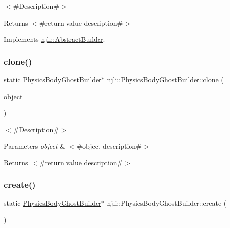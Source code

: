 $<$\#\+Description\#$>$

\begin{DoxyReturn}{Returns}
$<$\#return value description\#$>$ 
\end{DoxyReturn}


Implements \mbox{\hyperlink{classnjli_1_1_abstract_builder_aa1d220053e182c37b31b427499c6eacf}{njli\+::\+Abstract\+Builder}}.

\mbox{\label{classnjli_1_1_physics_body_ghost_builder_acf64508f874e55455f7b08eb5fd379e3}} 
\subsubsection{\texorpdfstring{clone()}{clone()}}
{\footnotesize\ttfamily static \mbox{\hyperlink{classnjli_1_1_physics_body_ghost_builder}{Physics\+Body\+Ghost\+Builder}}$\ast$ njli\+::\+Physics\+Body\+Ghost\+Builder\+::clone (\begin{DoxyParamCaption}\item[{const \mbox{\hyperlink{classnjli_1_1_physics_body_ghost_builder}{Physics\+Body\+Ghost\+Builder}} \&}]{object }\end{DoxyParamCaption})\hspace{0.3cm}{\ttfamily [static]}}

$<$\#\+Description\#$>$


\begin{DoxyParams}{Parameters}
{\em object} & $<$\#object description\#$>$\\
\hline
\end{DoxyParams}
\begin{DoxyReturn}{Returns}
$<$\#return value description\#$>$ 
\end{DoxyReturn}
\mbox{\label{classnjli_1_1_physics_body_ghost_builder_aceb6f0a62a709dabd4dd0a42d9bc9259}} 
\subsubsection{\texorpdfstring{create()}{create()}}
{\footnotesize\ttfamily static \mbox{\hyperlink{classnjli_1_1_physics_body_ghost_builder}{Physics\+Body\+Ghost\+Builder}}$\ast$ njli\+::\+Physics\+Body\+Ghost\+Builder\+::create (\begin{DoxyParamCaption}{ }\end{DoxyParamCaption})\hspace{0.3cm}{\ttfamily [static]}}


